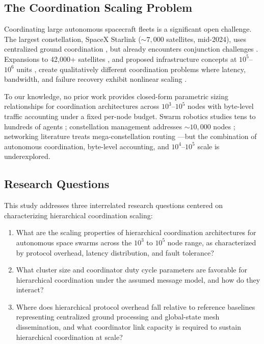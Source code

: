 \documentclass[journal]{IEEEtran}
\begin{document}
\subsection{The Coordination Scaling Problem}

Coordinating large autonomous spacecraft fleets is a significant open challenge. The largest constellation, SpaceX Starlink (${\sim}7{,}000$ satellites, mid-2024), uses centralized ground coordination \cite{starlink_ops}, but already encounters conjunction challenges \cite{esa_conjunction}. Expansions to 42{,}000+ satellites \cite{kuiper, oneweb_mgmt}, and proposed infrastructure concepts at $10^5$--$10^6$ units \cite{oneil_1976, badescu_2006}, create qualitatively different coordination problems where latency, bandwidth, and failure recovery exhibit nonlinear scaling \cite{lynch_distributed}.

To our knowledge, no prior work provides closed-form parametric sizing relationships for coordination architectures across $10^3$--$10^5$ nodes with byte-level traffic accounting under a fixed per-node budget. Swarm robotics studies tens to hundreds of agents \cite{reynolds_1987, brambilla_2013}; constellation management addresses ${\sim}10{,}000$ nodes \cite{wertz_smad}; networking literature treats mega-constellation routing \cite{handley_2018, del_portillo_mega, akyildiz_isl}---but the combination of autonomous coordination, byte-level accounting, and $10^4$--$10^5$ scale is underexplored.

\subsection{Research Questions}

This study addresses three interrelated research questions centered on characterizing hierarchical coordination scaling:

\begin{enumerate}
    \item[\textbf{RQ1:}] What are the scaling properties of hierarchical coordination architectures for autonomous space swarms across the $10^3$ to $10^5$ node range, as characterized by protocol overhead, latency distribution, and fault tolerance?
    \item[\textbf{RQ2:}] What cluster size and coordinator duty cycle parameters are favorable for hierarchical coordination under the assumed message model, and how do they interact?
    \item[\textbf{RQ3:}] Where does hierarchical protocol overhead fall relative to reference baselines representing centralized ground processing and global-state mesh dissemination, and what coordinator link capacity is required to sustain hierarchical coordination at scale?
\end{enumerate}
\end{document}
